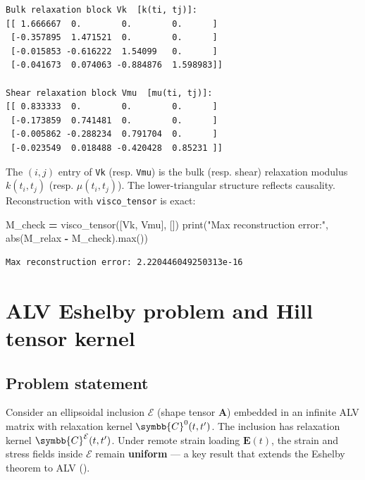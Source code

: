 \documentclass[
  a4paper,
  numbers=noendperiod,
  DIV=12]{scrreprt}
\newenvironment{Shaded}{\begin{snugshade}}{\end{snugshade}}
\newcommand{\BuiltInTok}[1]{#1}
\newcommand{\NormalTok}[1]{#1}
\newcommand{\OperatorTok}[1]{\textcolor[rgb]{0.81,0.36,0.00}{\textbf{#1}}}
\newcommand{\StringTok}[1]{\textcolor[rgb]{0.31,0.60,0.02}{#1}}
\newcommand{\uu}[1]{{\symbf{{#1}}}}
\newcommand{\uuuu}[1]{{\symbb{{#1}}}}
\begin{document}
\begin{verbatim}
Bulk relaxation block Vk  [k(ti, tj)]:
[[ 1.666667  0.        0.        0.      ]
 [-0.357895  1.471521  0.        0.      ]
 [-0.015853 -0.616222  1.54099   0.      ]
 [-0.041673  0.074063 -0.884876  1.598983]]

Shear relaxation block Vmu  [mu(ti, tj)]:
[[ 0.833333  0.        0.        0.      ]
 [-0.173859  0.741481  0.        0.      ]
 [-0.005862 -0.288234  0.791704  0.      ]
 [-0.023549  0.018488 -0.420428  0.85231 ]]
\end{verbatim}

The \((i,j)\) entry of \texttt{Vk} (resp. \texttt{Vmu}) is the bulk
(resp. shear) relaxation modulus \(k(t_i,t_j)\) (resp.
\(\mu(t_i,t_j)\)). The lower-triangular structure reflects causality.
Reconstruction with \texttt{visco\_tensor} is exact:

\begin{Shaded}
\begin{Highlighting}[]
\NormalTok{M\_check }\OperatorTok{=}\NormalTok{ visco\_tensor([Vk, Vmu], [])}
\BuiltInTok{print}\NormalTok{(}\StringTok{"Max reconstruction error:"}\NormalTok{, }\BuiltInTok{abs}\NormalTok{(M\_relax }\OperatorTok{{-}}\NormalTok{ M\_check).}\BuiltInTok{max}\NormalTok{())}
\end{Highlighting}
\end{Shaded}

\begin{verbatim}
Max reconstruction error: 2.220446049250313e-16
\end{verbatim}

\section{ALV Eshelby problem and Hill tensor
kernel}\label{sec-ageing-eshelby}

\subsection{Problem statement}\label{problem-statement}

Consider an ellipsoidal inclusion \(\mathcal{E}\) (shape tensor
\(\uu{A}\)) embedded in an infinite ALV matrix with relaxation kernel
\(\uuuu{C}^0(t,t')\). The inclusion has relaxation kernel
\(\uuuu{C}^\mathcal{E}(t,t')\). Under remote strain loading
\(\uu{E}(t)\), the strain and stress fields inside \(\mathcal{E}\)
remain \textbf{uniform} --- a key result that extends the Eshelby
theorem to ALV ().
\end{document}
